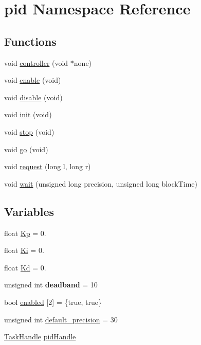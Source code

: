 \hypertarget{namespacepid}{}\section{pid Namespace Reference}
\label{namespacepid}
\subsection*{Functions}
\begin{DoxyCompactItemize}
\item 
void \hyperlink{namespacepid_ab65dc5974d66ecc9406878a375244f20}{controller} (void $\ast$none)
\item 
void \hyperlink{namespacepid_a4a4e5d1d2391a4ce24308442c4d69723}{enable} (void)
\item 
void \hyperlink{namespacepid_aba928d2e1b704af6cf1e652224411be5}{disable} (void)
\item 
void \hyperlink{namespacepid_aa59662d2f69d5a905a28f2ca9bc6bdcb}{init} (void)
\item 
void \hyperlink{namespacepid_a702bbb1d722eedebf32c55c89ff8afd6}{stop} (void)
\item 
void \hyperlink{namespacepid_a3a4e4a51df909f0aa3b2df01d35ff75b}{go} (void)
\item 
void \hyperlink{namespacepid_a8a2a0422275eb1a3310411a7eccda378}{request} (long l, long r)
\item 
void \hyperlink{namespacepid_ae415ddecc97484b1195e22a89b429506}{wait} (unsigned long precision, unsigned long block\+Time)
\end{DoxyCompactItemize}
\subsection*{Variables}
\begin{DoxyCompactItemize}
\item 
float \hyperlink{namespacepid_ad77953fe15d091ff43f7bd3ddd2402b0}{Kp} = 0.
\item 
float \hyperlink{namespacepid_ac63d639f53e93763cbf9f54838a3e325}{Ki} = 0.
\item 
float \hyperlink{namespacepid_ab6d926f5578bc84849cd8306b32a7481}{Kd} = 0.
\item 
\mbox{\label{namespacepid_aa179832793655bda657144efab78d58a}} 
unsigned int {\bfseries deadband} = 10
\item 
bool \hyperlink{namespacepid_a210c97219b84549120ef7b0a27d75971}{enabled} \mbox{[}2\mbox{]} = \{true, true\}
\item 
unsigned int \hyperlink{namespacepid_ab7ebcf570abd665235d5edd4e78c1d2a}{default\+\_\+precision} = 30
\item 
\hyperlink{API_8h_a23dca3c0de10682afb982677ff292f77}{Task\+Handle} \hyperlink{namespacepid_a14ac02223a13e370357cc0c8ded9864d}{pid\+Handle}
\end{DoxyCompactItemize}


